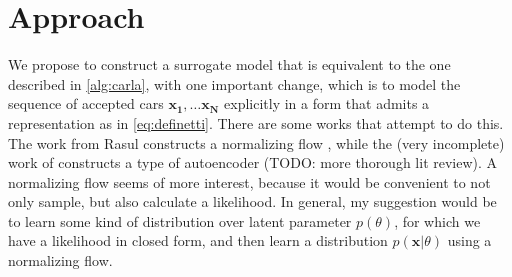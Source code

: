\documentclass{article}
\begin{document}
\section{Approach}
We propose to construct a surrogate model that is equivalent to the one described in \autoref{alg:carla}, with one important change, which is to model the sequence of accepted cars $\mathbf{x_1}, \dots \mathbf{x_N}$ explicitly in a form that admits a representation as in \autoref{eq:definetti}. There are some works that attempt to do this. The work from Rasul constructs a normalizing flow \cite{Rasul2019}, while the (very incomplete) work of \cite{Dosovitskiy17} constructs a type of autoencoder (TODO: more thorough lit review). A normalizing flow seems of more interest, because it would be convenient to not only sample, but also calculate a likelihood. In general, my suggestion would be to learn some kind of distribution over latent parameter $p(\theta)$, for which we have a likelihood in closed form, and then learn a distribution $p(\mathbf{x}|\theta)$ using a normalizing flow.




\end{document}
